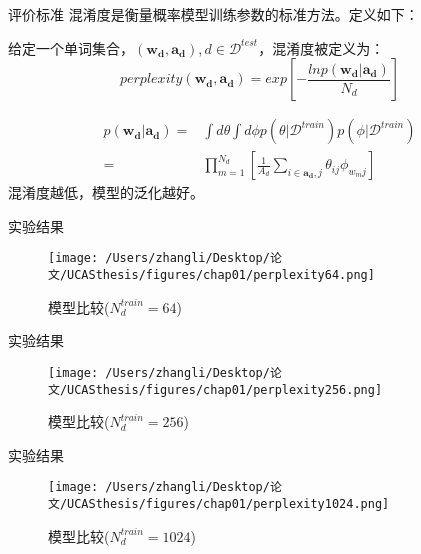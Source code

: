\documentclass[presentation]{beamer}
\begin{document}
\begin{frame}[label={sec:orgheadline10}]{评价标准}
混淆度是衡量概率模型训练参数的标准方法。定义如下：
\begin{definition}
\label{def:perplexity}
给定一个单词集合，$(\mathbf{w_d},\mathbf{a_d}),d \in \mathcal{D} ^{test}$，混淆度被定义为：
\begin{equation}
\label{equ:perplexity}
perplexity(\mathbf{w_d},\mathbf{a_d}) = exp[-\frac{lnp(\mathbf{w_d}|\mathbf{a_d})}{N_d}]
\end{equation}
\end{definition}

\begin{align}
\label{equ:prob}
p(\mathbf{w_d}|\mathbf{a_d}) =&\int d\theta \int d\phi p(\theta|\mathcal{D} ^{train})p(\phi | \mathcal{D} ^{train}) \nonumber \\
=& \prod_{m=1}^{N_d}[\frac{1}{A_d}\sum_{i \in \mathbf{a_d},j}\theta_{ij}\phi_{w_mj}]
\end{align}
混淆度越低，模型的泛化越好。
\end{frame}
\begin{frame}[label={sec:orgheadline11}]{实验结果}
\begin{figure}[htb]
\centering
\texttt{[image: /Users/zhangli/Desktop/论文/UCASthesis/figures/chap01/perplexity64.png]}
\caption{\label{fig:orgparagraph4}
模型比较(\(N_d^{train}=64\))}
\end{figure}
\end{frame}

\begin{frame}[label={sec:orgheadline12}]{实验结果}
\begin{figure}[htb]
\centering
\texttt{[image: /Users/zhangli/Desktop/论文/UCASthesis/figures/chap01/perplexity256.png]}
\caption{\label{fig:orgparagraph5}
模型比较(\(N_d^{train}=256\))}
\end{figure}
\end{frame}

\begin{frame}[label={sec:orgheadline13}]{实验结果}
\begin{figure}[htb]
\centering
\texttt{[image: /Users/zhangli/Desktop/论文/UCASthesis/figures/chap01/perplexity1024.png]}
\caption{\label{fig:orgparagraph6}
模型比较(\(N_d^{train}=1024\))}
\end{figure}
\end{frame}
\end{document}
